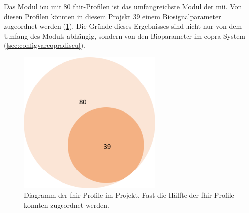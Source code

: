 Das Modul \glqq\ac{icu}\grqq{} mit 80 \ac{fhir}-Profilen ist das umfangreichste Modul der \ac{mii}. Von diesen Profilen könnten in diesem Projekt 39 einem Biosignalparameter zugeordnet werden (\ref{fig:profile}). Die Gründe dieses Ergebnisses sind nicht nur von dem Umfang des Moduls abhängig, sondern von den Bioparameter im \ac{copra}-System (\ref{sec:configvarcopradiscu}).

\clearpage

\begin{figure}[ht]
	\centering
	\includegraphics[height=7cm]{figures/profile}
	\caption[Diagramm der \acs{fhir}-Profile im Projekt]{Diagramm der \acs{fhir}-Profile im Projekt. Fast die Hälfte der \ac{fhir}-Profile konnten zugeordnet werden.}
	\label{fig:profile}
\end{figure}
